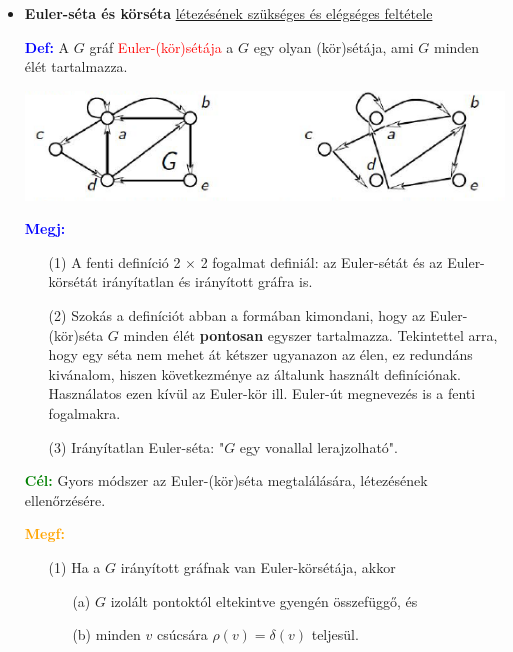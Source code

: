 \documentclass[../../szobeli.tex]{subfiles}
\begin{document}
\begin{center}
    \noindent{}
\end{center}

    \begin{itemize}
        \item \textbf{Euler-séta és körséta} \underline{létezésének szükséges és elégséges feltétele}

        \textcolor{blue}{\textbf{Def:}} A $G$ gráf \textcolor{red}{Euler-(kör)sétája} a $G$ egy olyan (kör)sétája, ami $G$ minden élét tartalmazza.

        \includegraphics[width=\textwidth]{img/1.png}

        \textcolor{blue}{\textbf{Megj:}} \begin{itemize}
            \item[(1)] A fenti definíció 2 $\times$ 2 fogalmat definiál: az Euler-sétát és az Euler-körsétát irányítatlan és irányított gráfra is. 
            \item[(2)] Szokás a definíciót abban a formában kimondani, hogy az Euler-(kör)séta $G$ minden élét \textbf{pontosan} egyszer tartalmazza. Tekintettel arra, hogy egy séta nem mehet át kétszer ugyanazon az élen, ez redundáns kivánalom, hiszen következménye az általunk használt definíciónak. Használatos ezen kívül az Euler-kör ill. Euler-út megnevezés is a fenti fogalmakra. 
            \item[(3)] Irányítatlan Euler-séta: "$G$ egy vonallal lerajzolható".
        \end{itemize}

        \textcolor{green}{\textbf{Cél:}} Gyors módszer az Euler-(kör)séta megtalálására, létezésének ellenőrzésére.

        \textcolor{orange}{\textbf{Megf:}} \begin{itemize}
            \item[(1)] Ha a $G$ irányított gráfnak van Euler-körsétája, akkor \begin{itemize}
                \item[(a)] $G$ izolált pontoktól eltekintve gyengén összefüggő, és 
                \item[(b)] minden $v$ csúcsára $\rho(v) = \delta(v)$ teljesül.
            \end{itemize}
        \end{itemize}
        

\end{itemize}
\end{document}
